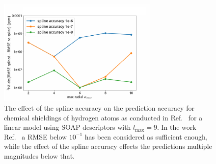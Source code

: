 \begin{figure}
    \centering
    \includegraphics[width=0.7\textwidth]{fig/spline-accuracy-v2.pdf}
    \caption{The effect of the spline accuracy on the prediction accuracy for chemical shieldings of hydrogen atoms as conducted in Ref.~\cite{paruzzo2018chemical} for a linear model using SOAP descriptors with $l_\textrm{max}=9$. In the work Ref.~\cite{paruzzo2018chemical} a RMSE below $10^{-1}$ has been considered as sufficient enough, while the effect of the spline accuracy effects the predictions multiple magnitudes below that.}
    \label{fig:spline-accuray}
\end{figure}

